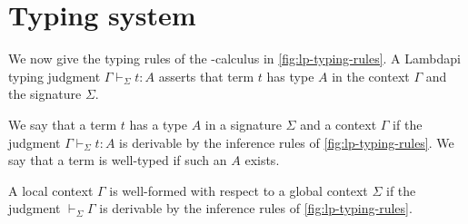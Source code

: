 \section{Typing system}
\label{sect:lambdapi-typing}

We now give the typing rules of the \lpm{}-calculus in \cref{fig:lp-typing-rules}.
A Lambdapi typing judgment $\Gamma \vdash_\Sigma t : A$ asserts that term $t$ has type $A$ in the context $\Gamma$ and the signature $\Sigma$.


\begin{definition}
We say that a term $t$ has a type $A$ in a signature $\Sigma$ and a context $\Gamma$ if the judgment $\Gamma \vdash_\Sigma t: A$ is
derivable by the inference rules of \cref{fig:lp-typing-rules}. We say that a term is well-typed if such an $A$ exists.
\end{definition}

\begin{definition}
A local context $\Gamma$ is well-formed with respect to a global context $\Sigma$ if the judgment $\vdash_\Sigma \Gamma$ is derivable by the inference rules of \cref{fig:lp-typing-rules}.
\end{definition}


